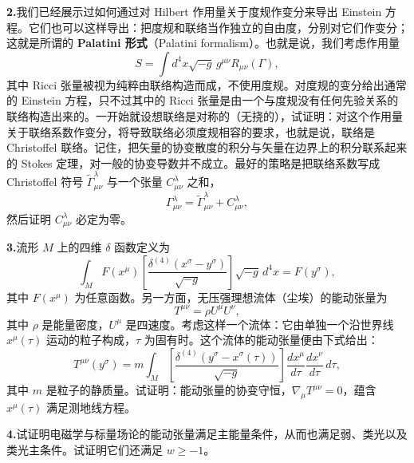 \textbf{2.}\quad 我们已经展示过如何通过对 Hilbert 作用量关于度规作变分来导出 Einstein 方程。它们也可以这样导出：把度规和联络当作独立的自由度，分别对它们作变分；这就是所谓的
\textbf{Palatini 形式}（Palatini formalism）。也就是说，我们考虑作用量
\begin{equation*}
S = \int d^{4}x\sqrt{-g}\,g^{\mu\nu}R_{\mu\nu}(\Gamma),
\end{equation*}
其中 Ricci 张量被视为纯粹由联络构造而成，不使用度规。对度规的变分给出通常的 Einstein 方程，只不过其中的 Ricci 张量是由一个与度规没有任何先验关系的联络构造出来的。一开始就设想联络是对称的（无挠的），试证明：对这个作用量关于联络系数作变分，将导致联络必须度规相容的要求，也就是说，联络是 Christoffel 联络。记住，把矢量的协变散度的积分与矢量在边界上的积分联系起来的 Stokes 定理，对一般的协变导数并不成立。最好的策略是把联络系数写成 Christoffel 符号 $\widetilde{\Gamma}^{\lambda}_{\mu\nu}$ 与一个张量 $C^{\lambda}_{\mu\nu}$ 之和，
\begin{equation*}
\Gamma^{\lambda}_{\mu\nu} = \widetilde{\Gamma}^{\lambda}_{\mu\nu} + C^{\lambda}_{\mu\nu},
\end{equation*}
然后证明 $C^{\lambda}_{\mu\nu}$ 必定为零。

\textbf{3.}\quad 流形 $M$ 上的四维 $\delta$ 函数定义为
\begin{equation*}
\int_{M}F(x^{\mu})\left[\frac{\delta^{(4)}(x^{\sigma}-y^{\sigma})}{\sqrt{-g}}\right]\sqrt{-g}\,d^{4}x = F(y^{\sigma}),
\tag{4.157}
\end{equation*}
其中 $F(x^{\mu})$ 为任意函数。另一方面，无压强理想流体（尘埃）的能动张量为
\begin{equation*}
T^{\mu\nu} = \rho U^{\mu}U^{\nu},
\tag{4.158}
\end{equation*}
其中 $\rho$ 是能量密度，$U^{\mu}$ 是四速度。考虑这样一个流体：它由单独一个沿世界线 $x^{\mu}(\tau)$ 运动的粒子构成，$\tau$ 为固有时。这个流体的能动张量便由下式给出：
\begin{equation*}
T^{\mu\nu}(y^{\sigma}) = m\int_{M}\left[\frac{\delta^{(4)}(y^{\sigma}-x^{\sigma}(\tau))}{\sqrt{-g}}\right]\frac{dx^{\mu}}{d\tau}\frac{dx^{\nu}}{d\tau}\,d\tau,
\tag{4.159}
\end{equation*}
其中 $m$ 是粒子的静质量。试证明：能动张量的协变守恒，$\nabla_{\mu}T^{\mu\nu}=0$，蕴含 $x^{\mu}(\tau)$ 满足测地线方程。

\textbf{4.}\quad 试证明电磁学与标量场论的能动张量满足主能量条件，从而也满足弱、类光以及类光主条件。试证明它们还满足 $w\geq -1$。

